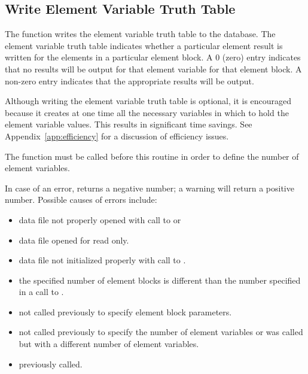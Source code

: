 \subsection{Write Element Variable Truth Table}

The function  writes the \exo{} element
variable truth table to the database. The element variable truth table
indicates whether a particular element result is written for the
elements in a particular element block. A 0 (zero) entry indicates
that no results will be output for that element variable for that
element block. A non-zero entry indicates that the appropriate results
will be output.

Although writing the element variable truth table is optional, it is
encouraged because it creates at one time all the necessary
 variables in which to hold the \exo{} element variable
values. This results in significant time savings. See
Appendix~\ref{app:efficiency} for a discussion of efficiency issues.

The function  must be called before
this routine in order to define the number of element variables.

In case of an error,  returns a
negative number; a warning will return a positive number. Possible
causes of errors include:

\begin{itemize}
 \item data file not properly opened with call to 
 or 

 \item data file opened for read only.

 \item data file not initialized properly with call to
 .

 \item the specified number of element blocks is different than the
 number specified in a call to .

 \item {} not called previously to specify
 element block parameters.

 \item {} not called previously to specify
 the number of element variables or was called but with a different
 number of element variables.

 \item {} previously called.
\end{itemize}


